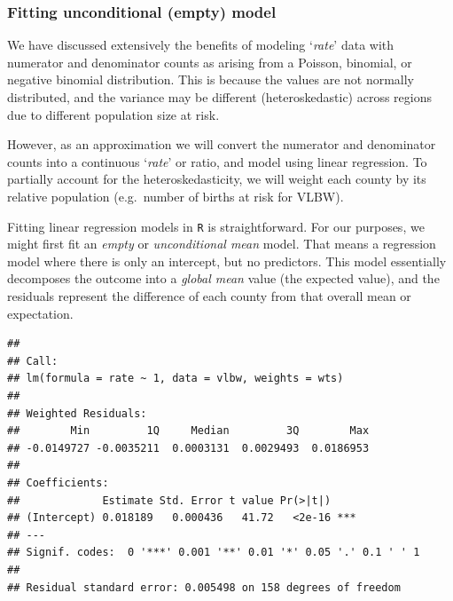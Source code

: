 \documentclass[
]{book}
\newenvironment{Shaded}{\begin{snugshade}}{\end{snugshade}}
\newcommand{\AttributeTok}[1]{\textcolor[rgb]{0.77,0.63,0.00}{#1}}
\newcommand{\CommentTok}[1]{\textcolor[rgb]{0.56,0.35,0.01}{\textit{#1}}}
\newcommand{\DecValTok}[1]{\textcolor[rgb]{0.00,0.00,0.81}{#1}}
\newcommand{\FunctionTok}[1]{\textcolor[rgb]{0.00,0.00,0.00}{#1}}
\newcommand{\NormalTok}[1]{#1}
\newcommand{\OtherTok}[1]{\textcolor[rgb]{0.56,0.35,0.01}{#1}}
\newcommand{\SpecialCharTok}[1]{\textcolor[rgb]{0.00,0.00,0.00}{#1}}
\begin{document}
\hypertarget{fitting-unconditional-empty-model}{%
\subsubsection{Fitting unconditional (empty) model}\label{fitting-unconditional-empty-model}}

We have discussed extensively the benefits of modeling `\emph{rate}' data with numerator and denominator counts as arising from a Poisson, binomial, or negative binomial distribution. This is because the values are not normally distributed, and the variance may be different (heteroskedastic) across regions due to different population size at risk.

However, as an approximation we will convert the numerator and denominator counts into a continuous `\emph{rate}' or ratio, and model using linear regression. To partially account for the heteroskedasticity, we will weight each county by its relative population (e.g.~number of births at risk for VLBW).

Fitting linear regression models in \texttt{R} is straightforward. For our purposes, we might first fit an \emph{empty} or \emph{unconditional mean} model. That means a regression model where there is only an intercept, but no predictors. This model essentially decomposes the outcome into a \emph{global mean} value (the expected value), and the residuals represent the difference of each county from that overall mean or expectation.

\begin{Shaded}
\end{Shaded}

\begin{verbatim}
## 
## Call:
## lm(formula = rate ~ 1, data = vlbw, weights = wts)
## 
## Weighted Residuals:
##        Min         1Q     Median         3Q        Max 
## -0.0149727 -0.0035211  0.0003131  0.0029493  0.0186953 
## 
## Coefficients:
##             Estimate Std. Error t value Pr(>|t|)    
## (Intercept) 0.018189   0.000436   41.72   <2e-16 ***
## ---
## Signif. codes:  0 '***' 0.001 '**' 0.01 '*' 0.05 '.' 0.1 ' ' 1
## 
## Residual standard error: 0.005498 on 158 degrees of freedom
\end{verbatim}
\end{document}
